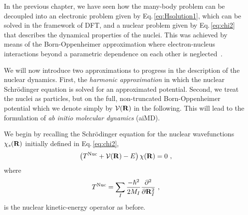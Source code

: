 In the previous chapter, we have seen how the many-body problem can be decoupled into an electronic problem given by Eq.\,\eqref{eq:Hsolution1}, which can be solved in the framework of DFT, and a nuclear problem given by Eq.\,\eqref{eq:chi2} that describes the dynamical properties of the nuclei. This was achieved by means of the Born-Oppenheimer approximation where electron-nucleus interactions beyond a parametric dependence on each other is neglected~\cite{BornOppenheimer}.

We will now introduce two approximations to progress in the description of the nuclear dynamics. First, the \emph{harmonic approximation} in which the nuclear Schr\"odinger equation is solved for an approximated potential. Second, we treat the nuclei as particles, but on the full, non-truncated Born-Oppenheimer potential which we denote simply by $\mathcal V ({\bf R})$ in the following. This will lead to the formulation of \emph{ab initio molecular dynamics} (aiMD).

We begin by recalling the Schr\"odinger equation for the nuclear wavefunctions $\chi_s ({\bf R})$ initially defined in Eq.\,\eqref{eq:chi2},
\begin{align}
  \left( T^{\rm Nuc} + \mathcal V ({\bf R}) - E \right) \chi ({\bf R})
  = 0~,
  \label{eq:BOSE}
\end{align}
where
\begin{align}
  T^{\rm Nuc}
    = \sum_I \frac{- \hbar^2}{2 M_I} \frac{\partial^2}{\partial {\bf R}_I^2}~,
  \label{eq:Tnuc2}
\end{align}
is the nuclear kinetic-energy operator as before.

